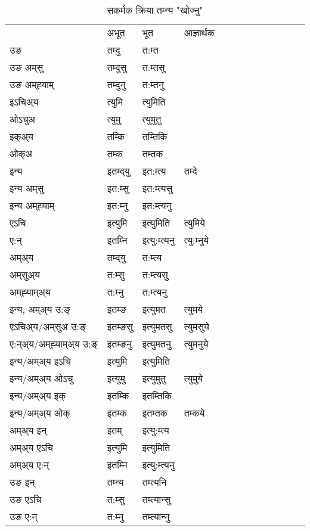 \begin{table}[H]
\centering
\caption{\label{umt.vt} सकर्मक क्रिया  तम्‍न्य  "खोज्नु"  }
\begin{tabular}{l|l|l|l|l|l|l|l|l|l|l|l|l}  \toprule
&अभूत & भूत & आज्ञार्थक \\ 
उङ &तम्दु &त:म्त \\ 
उङ अम्‌सु&तम्दुसु &त:म्तसु \\ 
उङ अम्‌ह्‍याम्&तम्दुनु &त:म्तनु \\ 
इऽचिअ्य &त्युमि &त्युमिति   \\ 
ओऽचुअ        &त्युमु &त्युमुतु   \\ 
इक्अ्य&तम्कि &तम्तिकि   \\ 
ओक्अ &तम्क &तम्तक   \\ 
इन्य & इतम्द्‌यु  & इत:म्त्य &तम्दे  \\ 
इन्य अम्‌सु& इत:म्सु  & इत:म्त्यसु   \\ 
इन्य अम्‌ह्‍याम्& इत:म्‍नु  & इत:म्त्यनु   \\ 
एऽचि & इत्युमि & इत्युमिति &त्युमिये    \\ 
ए:न् & इतम्‍नि  & इत्यु:म्त्यनु &त्यु:म्‍नुये  \\ 
अम्अ्य & तम्द्‌यु  & त:म्त्य  \\ 
अम्‌सुअ्य & त:म्सु & त:म्त्यसु  \\ 
अम्‌ह्‍याम्अ्य & त:म्‍नु  & त:म्त्यनु \\ 
\midrule
इन्य, अम्अ्य उ:ङ्‌ &इतम्ङ &इत्युमत &त्युमये \\ 
एऽचिअ्य/अम्‌सुअ उ:ङ्‌ &इतम्ङसु &इत्युमतसु &त्युमसुये \\ 
ए:न्अ्य/अम्‌ह्‍याम्अ्य उ:ङ्‌ &इतम्ङनु &इत्युमतनु &त्युमनुये \\ 
इन्य/अम्अ्य इऽचि &इत्युमि &इत्युमिति    \\ 
इन्य/अम्अ्य ओऽचु &इत्युमु &इत्युमुतु  &त्युमुये  \\ 
इन्य/अम्अ्य इक् &इतम्कि &इतम्तिकि   \\ 
इन्य/अम्अ्य ओक् &इतम्क &इतम्तक  &तम्कये  \\ 
अम्अ्य इन् & इतम् & इत्यु:म्त्य   \\ 
अम्अ्य एऽचि & इत्युमि & इत्युमिति    \\ 
अम्अ्य ए:न् & इतम्‍नि  & इत्यु:म्त्यनु  \\ 
\midrule
उङ इन् & तम्‍न्य  & तम्त्यनि  \\ 
उङ एऽचि & त:म्सु  & तम्त्यान्सु   \\ 
उङ ए:न्& त:म्‍नु  & तम्त्यान्‍नु   \\ 
\bottomrule
\end{tabular}
\end{table}


